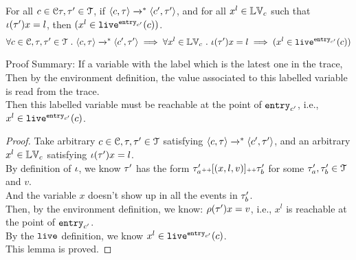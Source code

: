 %
\begin{lem}
\label{lem:inv_live}
For all $c \in \mathcal{C} \mathtt{\tau}, \mathtt{\tau}' \in \mathcal{T} $, if 
$\langle c, \mathtt{\tau} \rangle \xrightarrow{}^* \langle c', \mathtt{\tau}' \rangle$,
and for all $x^l \in \mathbb{LV}_c$ such that 
$\iota(\mathtt{\tau}') x = l $, then $(x^l \in \mathtt{live}^{\mathtt{entry}_{c'}}(c))$.
%
\[
	\forall c \in \mathcal{C} , \mathtt{\tau}, \mathtt{\tau}' \in \mathcal{T} ~.~
	\langle c, \mathtt{\tau} \rangle \xrightarrow{}^* \langle c', \mathtt{\tau}' \rangle
	\implies
	\forall x^l \in \mathbb{LV}_c ~.~ \iota(\mathtt{\tau}') x = l \implies (x^l \in \mathtt{live}^{\mathtt{entry}_{c'}}(c))
\]
\end{lem}
Proof Summary: 
If a variable with the label which is the latest one in the trace,
Then by the environment definition, the value associated to this labelled variable is read from the trace.
\\
Then this labelled variable must be reachable at the point of $\mathtt{entry}_{c'}$, i.e., $x^l \in \mathtt{live}^{\mathtt{entry}_{c'}}(c)$.
\begin{proof}
	Take arbitrary $c \in \mathcal{C} , \mathtt{\tau}, \mathtt{\tau}' \in \mathcal{T}$ satisfying 
	$\langle c, \mathtt{\tau} \rangle \xrightarrow{}^* \langle c', \mathtt{\tau}' \rangle$, 
	and an arbitrary $x^l \in \mathbb{LV}_c$ satisfying $\iota(\mathtt{\tau}') x = l$.
	\\
	By definition of $\iota$, we know $\mathtt{\tau}'$ has the form $\mathtt{\tau}'_{a} {\scriptscriptstyle ++} [(x, l, v)] {\scriptscriptstyle ++} \mathtt{\tau}_{b}'$
	for some $\mathtt{\tau}'_{a} , \mathtt{\tau}_{b}' \in \mathcal{T}$ and $v$.
	\\
	And the variable $x$ doesn't show up in all the events in $\mathtt{\tau}_b'$.
%
\\
	Then, by the environment definition, we know:
	$\rho(\mathtt{\tau}') x = v$, i.e., $x^l$ is reachable at the point of $\mathtt{entry}_{c'}$.
	\\
	By the $\mathtt{live}$ definition, we know $x^l \in \mathtt{live}^{\mathtt{entry}_{c'}}(c)$.
	\\
	This lemma is proved.
\end{proof}